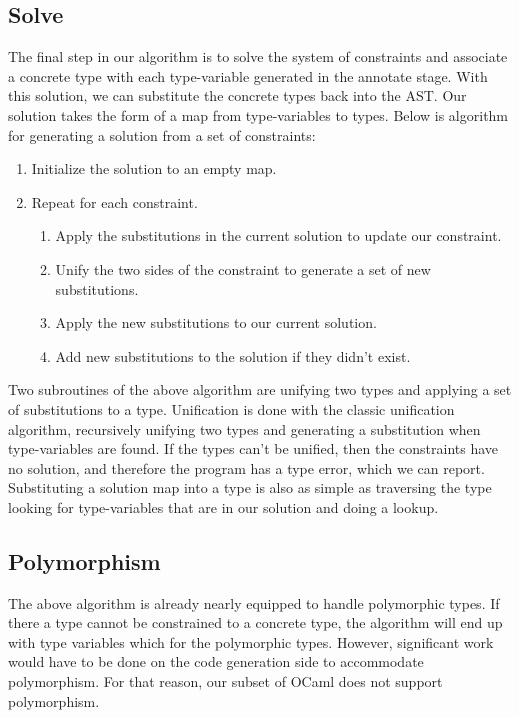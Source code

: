 \documentclass[12pt,a4paper,twoside,openright]{report}
\begin{document}
\subsection{Solve}
The final step in our algorithm is to solve the system of constraints and associate a concrete type with each type-variable generated in the annotate stage.
With this solution, we can substitute the concrete types back into the AST.
Our solution takes the form of a map from type-variables to types.
Below is algorithm for generating a solution from a set of constraints:
\begin{enumerate}
   \item Initialize the solution to an empty map.
   \item Repeat for each constraint.
      \begin{enumerate}[label=\roman*]
         \item Apply the substitutions in the current solution to update our constraint.
         \item Unify the two sides of the constraint to generate a set of new substitutions.
         \item Apply the new substitutions to our current solution.
         \item Add new substitutions to the solution if they didn't exist.
      \end{enumerate}
\end{enumerate}
Two subroutines of the above algorithm are unifying two types and applying a set of substitutions to a type.
Unification is done with the classic unification algorithm, recursively unifying two types and generating a substitution when type-variables are found.
If the types can't be unified, then the constraints have no solution, and therefore the program has a type error, which we can report.
Substituting a solution map into a type is also as simple as traversing the type looking for type-variables that are in our solution and doing a lookup.

\subsection{Polymorphism}
The above algorithm is already nearly equipped to handle polymorphic types.
If there a type cannot be constrained to a concrete type, the algorithm will end up with type variables which for the polymorphic types.
However, significant work would have to be done on the code generation side to accommodate polymorphism.
For that reason, our subset of OCaml does not support polymorphism.
\end{document}
